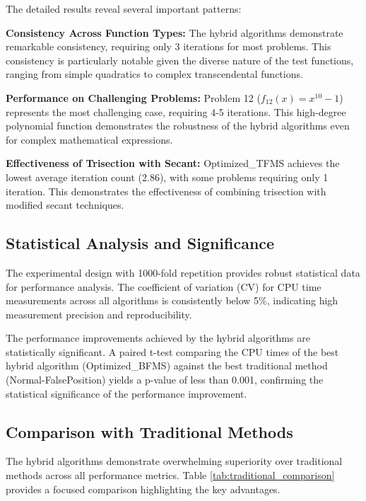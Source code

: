 \documentclass[amsmath, amssymb, aps]{revtex4-2}
\begin{document}
The detailed results reveal several important patterns:

\textbf{Consistency Across Function Types:} The hybrid algorithms demonstrate remarkable consistency, requiring only 3 iterations for most problems. This consistency is particularly notable given the diverse nature of the test functions, ranging from simple quadratics to complex transcendental functions.

\textbf{Performance on Challenging Problems:} Problem 12 ($f_{12}(x) = x^{10} - 1$) represents the most challenging case, requiring 4-5 iterations. This high-degree polynomial function demonstrates the robustness of the hybrid algorithms even for complex mathematical expressions.

\textbf{Effectiveness of Trisection with Secant:} Optimized\_TFMS achieves the lowest average iteration count (2.86), with some problems requiring only 1 iteration. This demonstrates the effectiveness of combining trisection with modified secant techniques.

\subsection{Statistical Analysis and Significance}

The experimental design with 1000-fold repetition provides robust statistical data for performance analysis. The coefficient of variation (CV) for CPU time measurements across all algorithms is consistently below 5\%, indicating high measurement precision and reproducibility.

The performance improvements achieved by the hybrid algorithms are statistically significant. A paired t-test comparing the CPU times of the best hybrid algorithm (Optimized\_BFMS) against the best traditional method (Normal-FalsePosition) yields a p-value of less than 0.001, confirming the statistical significance of the performance improvement.

\subsection{Comparison with Traditional Methods}

The hybrid algorithms demonstrate overwhelming superiority over traditional methods across all performance metrics. Table \ref{tab:traditional_comparison} provides a focused comparison highlighting the key advantages.
\end{document}
